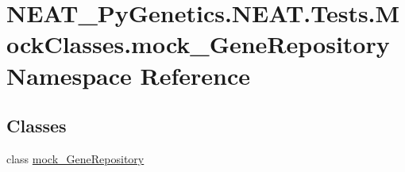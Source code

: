 \hypertarget{namespaceNEAT__PyGenetics_1_1NEAT_1_1Tests_1_1MockClasses_1_1mock__GeneRepository}{}\section{N\+E\+A\+T\+\_\+\+Py\+Genetics.\+N\+E\+A\+T.\+Tests.\+Mock\+Classes.\+mock\+\_\+\+Gene\+Repository Namespace Reference}
\label{namespaceNEAT__PyGenetics_1_1NEAT_1_1Tests_1_1MockClasses_1_1mock__GeneRepository}
\subsection*{Classes}
\begin{DoxyCompactItemize}
\item 
class \hyperlink{classNEAT__PyGenetics_1_1NEAT_1_1Tests_1_1MockClasses_1_1mock__GeneRepository_1_1mock__GeneRepository}{mock\+\_\+\+Gene\+Repository}
\end{DoxyCompactItemize}
